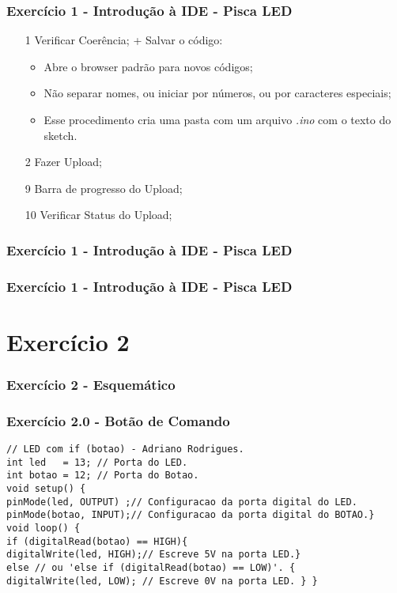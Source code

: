 \documentclass{beamer}
\begin{document}
\begin{frame}
	\frametitle{Exercício 1 - Introdução à IDE - Pisca LED}
	\begin{center}
	\end{center}
	\begin{itemize}
		\item[1] Verificar Coerência; + Salvar o código:
		\begin{itemize}
			\item Abre o browser padrão para novos códigos;
			\item Não separar nomes, ou iniciar por números, ou por caracteres especiais;
			\item Esse procedimento cria uma pasta com um arquivo \textit{.ino} com o texto do sketch.
		\end{itemize}
		\item[2] Fazer Upload;
		\item[9] Barra de progresso do Upload;
		\item[10] Verificar Status do Upload;
	\end{itemize}
\end{frame}

\begin{frame}
	\frametitle{Exercício 1 - Introdução à IDE - Pisca LED}
	\begin{center}
	\end{center}
\end{frame}

\begin{frame}
	\frametitle{Exercício 1 - Introdução à IDE - Pisca LED}
	\begin{center}
	\end{center}
\end{frame}

\section{Exercício 2}
\begin{frame}
	\frametitle{Exercício 2 - Esquemático}
	\begin{center}
	\end{center}
\end{frame}

\begin{frame}[fragile]
	\frametitle{Exercício 2.0 - Botão de Comando}

	\begin{lstlisting}[style=Arduino]
// LED com if (botao) - Adriano Rodrigues.
int led   = 13; // Porta do LED.
int botao = 12; // Porta do Botao.
void setup() {
pinMode(led, OUTPUT) ;// Configuracao da porta digital do LED.
pinMode(botao, INPUT);// Configuracao da porta digital do BOTAO.}
void loop() {
if (digitalRead(botao) == HIGH){
digitalWrite(led, HIGH);// Escreve 5V na porta LED.}
else // ou 'else if (digitalRead(botao) == LOW)'. {
digitalWrite(led, LOW); // Escreve 0V na porta LED. } } 	\end{lstlisting}
\end{frame}
\end{document}
